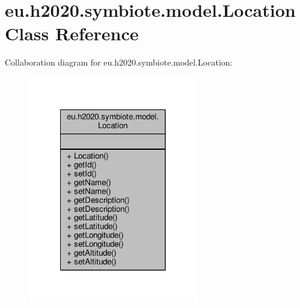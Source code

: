 \hypertarget{classeu_1_1h2020_1_1symbiote_1_1model_1_1Location}{}\section{eu.\+h2020.\+symbiote.\+model.\+Location Class Reference}
\label{classeu_1_1h2020_1_1symbiote_1_1model_1_1Location}


Collaboration diagram for eu.\+h2020.\+symbiote.\+model.\+Location\+:
\nopagebreak
\begin{figure}[H]
\begin{center}
\leavevmode
\includegraphics[width=210pt]{classeu_1_1h2020_1_1symbiote_1_1model_1_1Location__coll__graph}
\end{center}
\end{figure}
